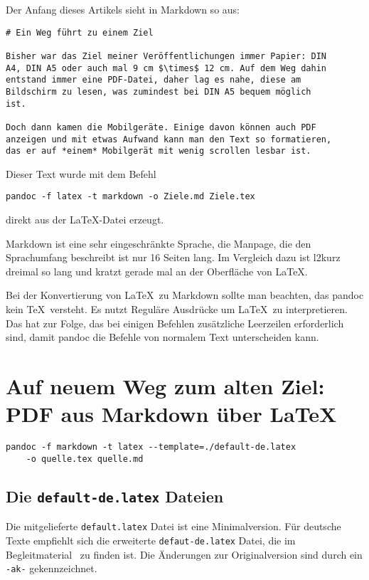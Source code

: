 \documentclass[11pt,ngerman,a4paper]{article}
\begin{document}
Der Anfang dieses Artikels sieht in Markdown so aus:

\begin{verbatim}
# Ein Weg führt zu einem Ziel

Bisher war das Ziel meiner Veröffentlichungen immer Papier: DIN
A4, DIN A5 oder auch mal 9 cm $\times$ 12 cm. Auf dem Weg dahin
entstand immer eine PDF-Datei, daher lag es nahe, diese am
Bildschirm zu lesen, was zumindest bei DIN A5 bequem möglich
ist.

Doch dann kamen die Mobilgeräte. Einige davon können auch PDF
anzeigen und mit etwas Aufwand kann man den Text so formatieren,
das er auf *einem* Mobilgerät mit wenig scrollen lesbar ist.
\end{verbatim}

Dieser Text wurde mit dem Befehl

\begin{verbatim}
pandoc -f latex -t markdown -o Ziele.md Ziele.tex
\end{verbatim}

direkt aus der LaTeX-Datei erzeugt.

Markdown ist eine sehr eingeschränkte Sprache, die Manpage, die den
Sprachumfang beschreibt ist nur 16 Seiten lang. Im Vergleich dazu ist
l2kurz dreimal so lang und kratzt gerade mal an der Oberfläche von
LaTeX.

Bei der Konvertierung von LaTeX~zu Markdown sollte man beachten, das
pandoc kein TeX~versteht. Es nutzt Reguläre Ausdrücke um LaTeX~zu
interpretieren. Das hat zur Folge, das bei einigen Befehlen zusätzliche
Leerzeilen erforderlich sind, damit pandoc die Befehle von normalem Text
unterscheiden kann.

\section{Auf neuem Weg zum alten Ziel: PDF aus Markdown über LaTeX}

\begin{verbatim}
pandoc -f markdown -t latex --template=./default-de.latex 
    -o quelle.tex quelle.md
\end{verbatim}

\subsection{Die \texttt{default-de.latex} Dateien}

Die mitgelieferte \texttt{default.latex} Datei ist eine Minimalversion.
Für deutsche Texte empfiehlt sich die erweiterte
\texttt{defaut-de.latex} Datei, die im
Begleitmaterial~\autocite{Ziele-git} zu finden ist. Die Änderungen zur
Originalversion sind durch ein \texttt{-ak-} gekennzeichnet.
\end{document}
